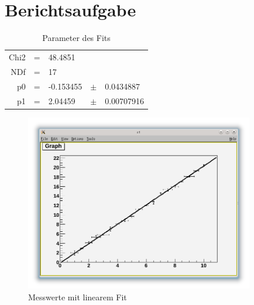 \section{Berichtsaufgabe}


\begin{table}[h]
\begin{center}
\begin{tabular}{rclcl}
Chi2 & = & 48.4851 &  \\ 
NDf & = & 17 &  \\ 
p0 & = & -0.153455 & $\pm$ & 0.0434887 \\ 
p1 & = & 2.04459 & $\pm$ & 0.00707916 \\ 
\end{tabular} 
\caption{Parameter des Fits}
\label{table:fit}
\end{center}
\end{table}


\begin{figure}[h]
\begin{center}
\includegraphics[width=10cm]{Uebung_10/fit.png}
\caption{Messwerte mit linearem Fit}
\end{center}
\end{figure}
